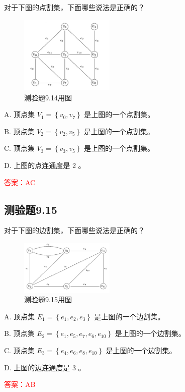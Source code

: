 \documentclass[UTF8, heading=true]{ctexart}
\begin{document}
对于下图的点割集，下面哪些说法是正确的？

\begin{figure}[H]
    \centering
    \includegraphics[width=0.4\textwidth]{9.14.jpg} %
    \caption{测验题9.14用图}
\end{figure}

A. 顶点集 $V_1=\left\{v_0, v_7\right\}$ 是上图的一个点割集。

B. 顶点集 $V_2=\left\{v_2, v_5\right\}$ 是上图的一个点割集。

C. 顶点集 $V_3=\left\{v_3, v_5\right\}$ 是上图的一个点割集。

D. 上图的点连通度是 2 。

\textcolor{red}{答案：AC}

\subsection{测验题9.15}

对于下图的边割集，下面哪些说法是正确的？

\begin{figure}[H]
    \centering
    \includegraphics[width=0.4\textwidth]{9.15.jpg} %
    \caption{测验题9.15用图}
\end{figure}

A. 顶点集 $E_1=\left\{e_1, e_2, e_3\right\}$ 是上图的一个边割集。

B. 顶点集 $E_2=\left\{e_1, e_5, e_7, e_6, e_{10}\right\}$ 是上图的一个边割集。

C. 顶点集 $E_3=\left\{e_4, e_6, e_8, e_{10}\right\}$ 是上图的一个边割集。

D. 上图的边连通度是 3 。


\textcolor{red}{答案：AB}
\end{document}
